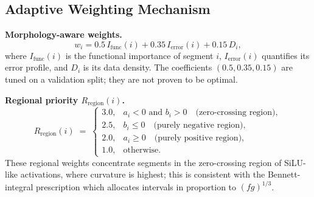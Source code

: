 \documentclass{article}
\theoremstyle{plain}
\theoremstyle{definition}
\theoremstyle{remark}
\begin{document}
\subsection{Adaptive Weighting Mechanism}

\noindent\textbf{Morphology-aware weights.}
\begin{equation}
w_i = 0.5\,I_{\mathrm{func}}(i) + 0.35\,I_{\mathrm{error}}(i) + 0.15\,D_i,
\end{equation}
where $I_{\mathrm{func}}(i)$ is the functional importance of segment $i$,
$I_{\mathrm{error}}(i)$ quantifies its error profile, and $D_i$ is its data
density. The coefficients $(0.5, 0.35, 0.15)$ are tuned on a validation
split; they are not proven to be optimal.

\noindent\textbf{Regional priority $R_{\mathrm{region}}(i)$.}
\begin{equation}
R_{\mathrm{region}}(i) \;=\;
\begin{cases}
3.0, & a_i < 0 \text{ and } b_i > 0 \quad \text{(zero-crossing region)},\\
2.5, & b_i \le 0 \quad \text{(purely negative region)},\\
2.0, & a_i \ge 0 \quad \text{(purely positive region)},\\
1.0, & \text{otherwise.}
\end{cases}
\end{equation}
These regional weights concentrate segments in the zero-crossing region of
SiLU-like activations, where curvature is highest; this is consistent with
the Bennett-integral prescription which allocates intervals in proportion to
$(fg)^{1/3}$.
\end{document}
